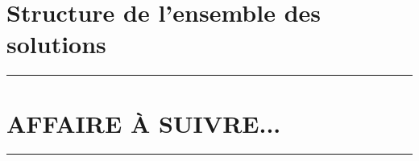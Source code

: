 \documentclass[12pt]{amsart}
\newcommand\contentdir{\jobname}
\begin{document}



\section{Structure de l'ensemble des solutions}






\bigskip

\hrule

\section{AFFAIRE À SUIVRE...}

\bigskip

\hrule




%
%
\end{document}
